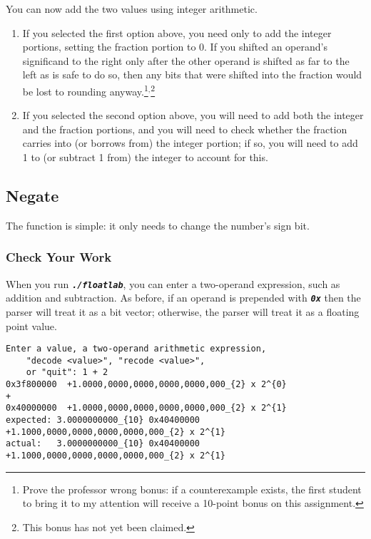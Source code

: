 You can now add the two values using integer arithmetic.

\begin{enumerate}
    \item If you selected the first option above, you need only to add the integer portions, setting the fraction portion to 0.
        If you shifted an operand's significand to the right only after the other operand is shifted as far to the left as is safe to do so, then any bits that were shifted into the fraction would be lost to rounding anyway.\footnote{
            Prove the professor wrong bonus: if a counterexample exists, the first student to bring it to my attention will receive a 10-point bonus on this assignment.
        }$^{,}$\footnote{
            This bonus has not yet been claimed.
        }
    \item If you selected the second option above, you will need to add both the integer and the fraction portions,
        and you will need to check whether the fraction carries into (or borrows from) the integer portion;
        if so, you will need to add 1 to (or subtract 1 from) the integer to account for this.
\end{enumerate}

\subsection{Negate}

The  function is simple: it only needs to change the number's sign bit.

\subsubsection*{Check Your Work}

When you run \texttt{\textbf{\textit{./floatlab}}}, you can enter a two-operand expression, such as addition and subtraction.
As before, if an operand is prepended with \texttt{\textbf{\textit{0x}}} then the parser will treat it as a bit vector;
otherwise, the parser will treat it as a floating point value.

\begin{verbatim}
Enter a value, a two-operand arithmetic expression,
    "decode <value>", "recode <value>",
    or "quit": 1 + 2
0x3f800000	+1.0000,0000,0000,0000,0000,000_{2} x 2^{0}
+
0x40000000	+1.0000,0000,0000,0000,0000,000_{2} x 2^{1}
expected: 3.0000000000_{10}	0x40400000	+1.1000,0000,0000,0000,0000,000_{2} x 2^{1}
actual:   3.0000000000_{10}	0x40400000	+1.1000,0000,0000,0000,0000,000_{2} x 2^{1}
\end{verbatim}

